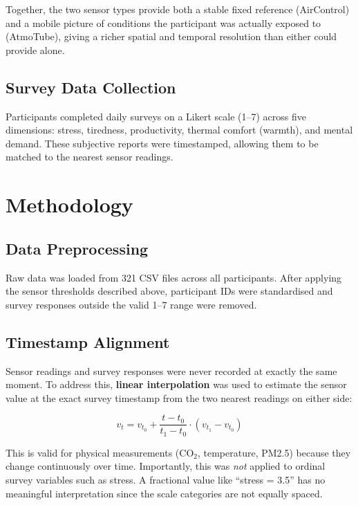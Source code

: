 \documentclass[12pt,a4paper]{article}
\begin{document}
Together, the two sensor types provide both a stable fixed reference (AirControl) and a mobile picture of conditions the participant was actually exposed to (AtmoTube), giving a richer spatial and temporal resolution than either could provide alone.

\subsection{Survey Data Collection}

Participants completed daily surveys on a Likert scale (1--7) across five dimensions: stress, tiredness, productivity, thermal comfort (warmth), and mental demand. These subjective reports were timestamped, allowing them to be matched to the nearest sensor readings.

\section{Methodology}

\subsection{Data Preprocessing}

Raw data was loaded from 321 CSV files across all participants. After applying the sensor thresholds described above, participant IDs were standardised and survey responses outside the valid 1--7 range were removed.

\subsection{Timestamp Alignment}

Sensor readings and survey responses were never recorded at exactly the same moment. To address this, \textbf{linear interpolation} was used to estimate the sensor value at the exact survey timestamp from the two nearest readings on either side:

\[
v_{t} = v_{t_0} + \frac{t - t_0}{t_1 - t_0} \cdot (v_{t_1} - v_{t_0})
\]

This is valid for physical measurements (CO$_2$, temperature, PM2.5) because they change continuously over time. Importantly, this was \textit{not} applied to ordinal survey variables such as stress. A fractional value like ``stress = 3.5'' has no meaningful interpretation since the scale categories are not equally spaced.
\end{document}
